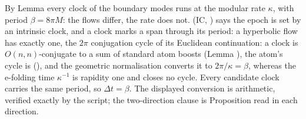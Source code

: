By Lemma  every clock of the boundary modes runs at the modular rate $\kappa$, with period $\beta = 8\pi M$: the flows differ, the rate does not. (IC, ) says the epoch is set by an intrinsic clock, and a clock marks a span through its period: a hyperbolic flow has exactly one, the $2\pi$ conjugation cycle of its Euclidean continuation: a clock is $O(n,n)$-conjugate to a sum of standard atom boosts (Lemma ), the atom's cycle is \cite[Prop.~7.21(1)]{ButlerT5} (), and the geometric normalisation converts it to $2\pi/\kappa = \beta$, whereas the e-folding time $\kappa^{-1}$ is rapidity one and closes no cycle. Every candidate clock carries the same period, so $\Delta t = \beta$. The displayed conversion is arithmetic, verified exactly by the script; the two-direction clause is Proposition  read in each direction.
